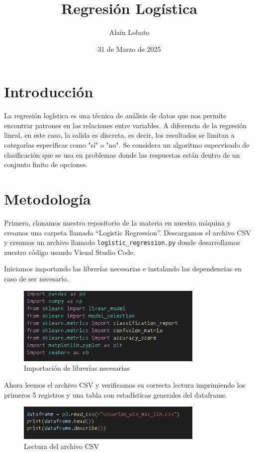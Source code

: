 \documentclass{article}
\begin{document}
\title{Regresión Logística}
\author{Alain Lobato}
\date{31 de Marzo de 2025}
\maketitle

\section{Introducción}
La regresión logística es una técnica de análisis de datos que nos permite encontrar patrones en las relaciones entre variables. A diferencia de la regresión lineal, en este caso, la salida es discreta, es decir, los resultados se limitan a categorías específicas como "sí" o "no". Se considera un algoritmo supervisado de clasificación que se usa en problemas donde las respuestas están dentro de un conjunto finito de opciones.

\section{Metodología}

Primero, clonamos nuestro repositorio de la materia en nuestra máquina y creamos una carpeta llamada ``Logistic Regression''. Descargamos el archivo CSV y creamos un archivo llamado \texttt{logistic\_regression.py} donde desarrollamos nuestro código usando Visual Studio Code.

Iniciamos importando las librerías necesarias e instalando las dependencias en caso de ser necesario.

\begin{figure}[H]
    \centering
    \includegraphics[width=0.8\textwidth]{img/1.png}
    \caption{Importación de librerías necesarias}
\end{figure}

Ahora leemos el archivo CSV y verificamos su correcta lectura imprimiendo los primeros 5 registros y una tabla con estadísticas generales del dataframe.

\begin{figure}[H]
    \centering
    \includegraphics[width=0.8\textwidth]{img/2.png}
    \caption{Lectura del archivo CSV}
\end{figure}
\end{document}
